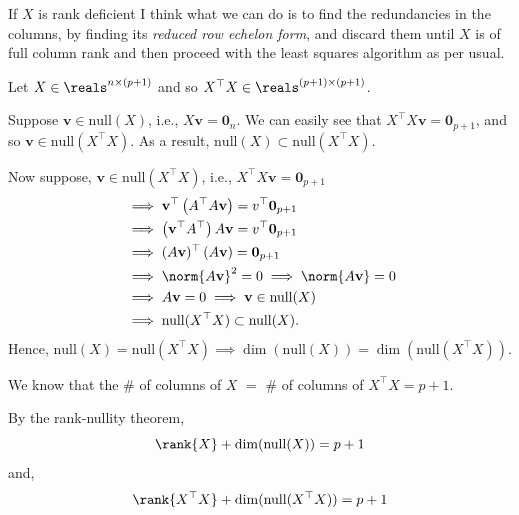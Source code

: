 \documentclass[12pt]{article}
\begin{document}
\begin{enumerate}
\begin{tcolorbox}[colback=white, sharp corners]
If $X$ is rank deficient I think what we can do is to find the redundancies in the columns, by finding its \emph{reduced row echelon form}, and discard them until $X$ is of full column rank and then proceed with the least squares algorithm as per usual. 

\end{tcolorbox}


\begin{tcolorbox}[colback=white, sharp corners]

\vspace{2mm}

Let $X \in \reals^{n \times (p+1)}$ and so $X^\top X \in \reals^{(p+1) \times (p+1)}$. 

\vspace{2mm}

Suppose $\mathbf{v} \in \mathrm{null}(X)$, i.e., $ X\mathbf{v} = \mathbf{0}_n$. We can easily see that $X^\top X \mathbf{v} = \mathbf{0}_{p+1}$, and so $\mathbf{v} \in \mathrm{null}(X^\top X)$. As a result, $\mathrm{null}(X) \subset \mathrm{null}(X^\top X)$. 

\vspace{2mm}

Now suppose, $\mathbf{v} \in \mathrm{null}(X^\top X)$, i.e., $ X^\top X\mathbf{v} = \mathbf{0}_{p+1}$ 
\begin{align*}
&\implies \mathbf{v}^\top \left( A^\top A \mathbf{v} \right) = v^\top \mathbf{0}_{p+1} \\ 
&\implies \left( \mathbf{v}^\top A^\top \right) A  \mathbf{v}  = v^\top \mathbf{0}_{p+1} \\
&\implies (A\mathbf{v})^\top \left( A\mathbf{v} \right) = \mathbf{0}_{p+1} \\
&\implies \norm{A\mathbf{v}}^2 = 0 \implies \norm{A\mathbf{v}} = 0\\
&\implies A \mathbf{v} = 0 \implies \mathbf{v} \in \mathrm{null}(X)\\
&\implies \mathrm{null}(X^\top X) \subset \mathrm{null}(X). 
\end{align*}
Hence, $\mathrm{null}(X) = \mathrm{null}(X^\top X) \implies \dim(\mathrm{null}(X)) = \dim(\mathrm{null}(X^\top X))$. 

We know that the \# of columns of $X$ $=$ \# of columns of $X^\top X = p+1$. 

By the rank-nullity theorem, 
\[
	\rank{X} + \dim(\mathrm{null}(X)) = p+1
\]
and, 
\[
	\rank{X^\top X} + \dim(\mathrm{null}(X^\top X)) = p+1
\]


\end{tcolorbox}
\end{enumerate}
\end{document}
